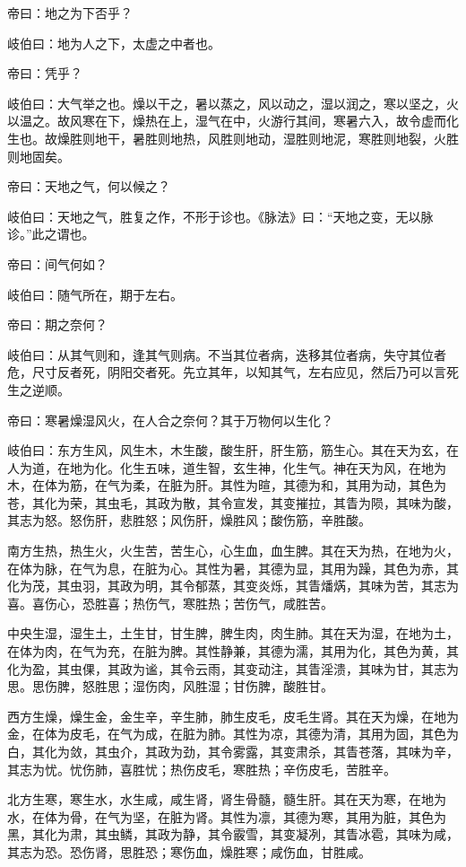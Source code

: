 \documentclass{article}%
\begin{document}
帝曰：地之为下否乎？

岐伯曰：地为人之下，太虚之中者也。

帝曰：凭乎？

岐伯曰：大气举之也。燥以干之，暑以蒸之，风以动之，湿以润之，寒以坚之，火以温之。故风寒在下，燥热在上，湿气在中，火游行其间，寒暑六入，故令虚而化生也。故燥胜则地干，暑胜则地热，风胜则地动，湿胜则地泥，寒胜则地裂，火胜则地固矣。

帝曰：天地之气，何以候之？

岐伯曰：天地之气，胜复之作，不形于诊也。《脉法》曰：“天地之变，无以脉诊。”此之谓也。

帝曰：间气何如？

岐伯曰：随气所在，期于左右。

帝曰：期之奈何？

岐伯曰：从其气则和，逢其气则病。不当其位者病，迭移其位者病，失守其位者危，尺寸反者死，阴阳交者死。先立其年，以知其气，左右应见，然后乃可以言死生之逆顺。

帝曰：寒暑燥湿风火，在人合之奈何？其于万物何以生化？

岐伯曰：东方生风，风生木，木生酸，酸生肝，肝生筋，筋生心。其在天为玄，在人为道，在地为化。化生五味，道生智，玄生神，化生气。神在天为风，在地为木，在体为筋，在气为柔，在脏为肝。其性为暄，其德为和，其用为动，其色为苍，其化为荣，其虫毛，其政为散，其令宣发，其变摧拉，其眚为陨，其味为酸，其志为怒。怒伤肝，悲胜怒；风伤肝，燥胜风；酸伤筋，辛胜酸。

南方生热，热生火，火生苦，苦生心，心生血，血生脾。其在天为热，在地为火，在体为脉，在气为息，在脏为心。其性为暑，其德为显，其用为躁，其色为赤，其化为茂，其虫羽，其政为明，其令郁蒸，其变炎烁，其眚燔焫，其味为苦，其志为喜。喜伤心，恐胜喜；热伤气，寒胜热；苦伤气，咸胜苦。

中央生湿，湿生土，土生甘，甘生脾，脾生肉，肉生肺。其在天为湿，在地为土，在体为肉，在气为充，在脏为脾。其性静兼，其德为濡，其用为化，其色为黄，其化为盈，其虫倮，其政为谧，其令云雨，其变动注，其眚淫溃，其味为甘，其志为思。思伤脾，怒胜思；湿伤肉，风胜湿；甘伤脾，酸胜甘。

西方生燥，燥生金，金生辛，辛生肺，肺生皮毛，皮毛生肾。其在天为燥，在地为金，在体为皮毛，在气为成，在脏为肺。其性为凉，其德为清，其用为固，其色为白，其化为敛，其虫介，其政为劲，其令雾露，其变肃杀，其眚苍落，其味为辛，其志为忧。忧伤肺，喜胜忧；热伤皮毛，寒胜热；辛伤皮毛，苦胜辛。

北方生寒，寒生水，水生咸，咸生肾，肾生骨髓，髓生肝。其在天为寒，在地为水，在体为骨，在气为坚，在脏为肾。其性为凛，其德为寒，其用为脏，其色为黑，其化为肃，其虫鳞，其政为静，其令霰雪，其变凝冽，其眚冰雹，其味为咸，其志为恐。恐伤肾，思胜恐；寒伤血，燥胜寒；咸伤血，甘胜咸。
\end{document}
